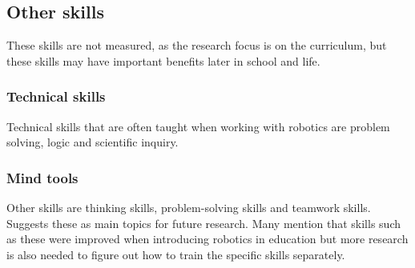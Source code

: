 \subsection*{Other skills}
These skills are not measured, as the research focus is on the curriculum, but these skills may have important benefits later in school and life.

\subsubsection*{Technical skills}
Technical skills that are often taught when working with robotics are problem solving, logic and scientific inquiry. 

\subsubsection*{Mind tools}
Other skills are thinking skills, problem-solving skills and teamwork skills. \cite{Benitti2012978} Suggests these as main topics for future research. Many mention that skills such as these were improved when introducing robotics in education but more research is also needed to figure out how to train the specific skills separately. 